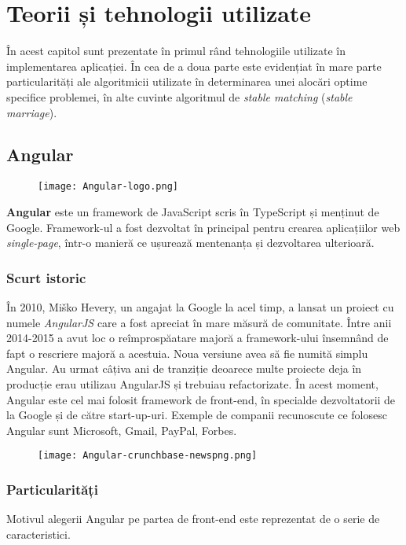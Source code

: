 \chapter{Teorii și tehnologii utilizate}

În acest capitol sunt prezentate în primul rând tehnologiile utilizate în implementarea aplicației. În cea de a doua parte este evidențiat în mare parte particularități ale algoritmicii utilizate în determinarea unei alocări optime specifice problemei, în alte cuvinte algoritmul de \textit{stable matching} (\textit{stable marriage}).

\section{Angular}
\begin{figure}[H]
	\texttt{[image: Angular-logo.png]}
\end{figure}

\textbf{Angular} este un framework de JavaScript scris în TypeScript și menținut de Google. Framework-ul a fost dezvoltat în principal pentru crearea aplicațiilor web \textit{single-page}, într-o manieră ce ușurează mentenanța și dezvoltarea ulterioară.

\subsection{Scurt istoric}
În 2010, Miško Hevery, un angajat la Google la acel timp, a lansat un proiect cu numele \textit{AngularJS} care a fost apreciat în mare măsură de comunitate. Între anii 2014-2015 a avut loc o reîmprospăatare majoră a framework-ului însemnând de fapt o rescriere majoră a acestuia. Noua versiune avea să fie numită simplu Angular. Au urmat câțiva ani de tranziție deoarece multe proiecte deja în producție erau utilizau AngularJS și  trebuiau refactorizate. În acest moment, Angular este cel mai folosit framework de front-end, în specialde dezvoltatorii de la Google și de către start-up-uri. Exemple de companii recunoscute ce folosesc Angular sunt Microsoft, Gmail, PayPal, Forbes.

\begin{figure}[H]
	\centering
	\texttt{[image: Angular-crunchbase-newspng.png]}
	\caption{\cite{angular-stats}}
\end{figure}

\subsection{Particularități}
Motivul alegerii Angular pe partea de front-end este reprezentat de o serie de caracteristici.

